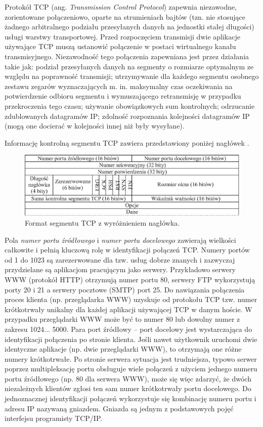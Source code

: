 Protokół TCP (ang. \emph{Transmission Control Protocol}) zapewnia niezawodne, zorientowane 
połączeniowo, oparte na strumieniach bajtów (tzn. nie stosujące żadnego arbitralnego podziału przesyłanych 
danych na jednostki stałej długości) usługi warstwy transportowej. Przed rozpoczęciem transmisji dwie aplikacje 
używające TCP muszą ustanowić połączenie w postaci wirtualnego kanału transmisyjnego. Niezawodność tego 
połączenia zapewniana jest przez działania takie jak: podział przesyłanych danych na segmenty o rozmiarze 
optymalnym ze względu na poprawność transmisji; utrzymywanie dla każdego segmentu osobnego zestawu zegarów 
wyznaczających m. in. maksymalny czas oczekiwania na potwierdzenie odbioru segmentu i wymuszającego retransmisję 
w przypadku przekroczenia tego czasu; używanie obowiązkowych sum kontrolnych; odrzucanie zdublowanych 
datagramów IP; zdolność rozpoznania kolejności datagramów IP (mogą one docierać w kolejności innej niż były 
wysyłane).

Informację kontrolną segmentu TCP zawiera przedstawiony poniżej nagłówek \cite{barylo2}.
\begin{figure}[h]
\centering
\includegraphics[width=5in]{./rysunki/format_segmentu_tcp.eps}
\caption{Format segmentu TCP z wyróżnieniem nagłówka.}
\label{segment_TCP}
\end{figure}

Pola \emph{numer portu źródłowego} i \emph{numer portu docelowego} zawierają wielkości całkowite i pełnią kluczową rolę w 
identyfikacji połączeń TCP. Numery portów od 1 do 1023 są zarezerwowane dla tzw. usług dobrze znanych i 
zazwyczaj przydzielane są aplikacjom pracującym jako serwery. Przykładowo serwery WWW (protokół HTTP) otrzymują 
numer portu 80, serwery FTP wykorzystują porty 20 i 21 a serwery pocztowe (SMTP) port 25. Do nawiązania 
połączenia proces klienta (np. przeglądarka WWW) uzyskuje od protokołu TCP tzw. numer krótkotrwały unikalny dla 
każdej aplikacji używającej TCP w danym hoście. W przypadku przeglądarki WWW może być to numer 80 lub dowolny 
numer z zakresu 1024... 5000. Para port źródłowy -- port docelowy jest wystarczająca do identyfikacji połączenia 
po stronie klienta. Jeśli nawet użytkownik uruchomi dwie identyczne aplikacje (np. dwie przeglądarki WWW), to 
otrzymają one różne numery krótkotrwałe. Po stronie serwera sytuacja jest trudniejsza, typowo serwer poprzez 
multipleksację portu obsługuje wiele połączeń z użyciem jednego numeru portu źródłowego (np. 80 dla serwera WWW),
może się więc zdarzyć, że dwóch niezależnych klientów zgłosi ten sam numer krótkotrwały portu docelowego. Do 
jednoznacznej identyfikacji połączeń wykorzystuje się kombinację numeru portu i adresu IP nazywaną gniazdem. 
Gniazda są jednym z podstawowych pojęć interfejsu programisty TCP/IP.

